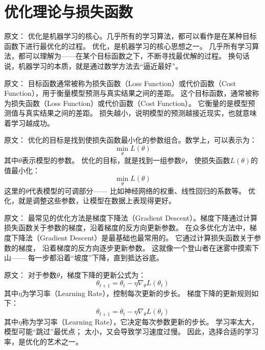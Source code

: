 \section{优化理论与损失函数}

原文：
优化是机器学习的核心。几乎所有的学习算法，都可以看作是在某种目标函数下进行最优化的过程。
优化，是机器学习的核心思想之一。  
几乎所有学习算法，都可以理解为——在某个目标函数之下，不断寻找最优解的过程。  
换句话说，机器学习的本质，就是通过数学方法去“逼近最好”。



原文：
目标函数通常被称为损失函数（Loss Function）或代价函数（Cost Function），用于衡量模型预测与真实结果之间的差距。
这个目标函数，通常被称为损失函数（Loss Function）或代价函数（Cost Function）。  
它衡量的是模型预测值与真实结果之间的差距。  
损失越小，说明模型的预测越接近现实，也就意味着学习越成功。



原文：
优化的目标是找到使损失函数最小化的参数组合。数学上，可以表示为：
$$
\min_{\theta} L(\theta)
$$
其中$\theta$表示模型的参数。
优化的目标，就是找到一组参数$\theta$，  
使损失函数$L(\theta)$的值最小化：
$$
\min_{\theta} L(\theta)
$$  
这里的$\theta$代表模型的可调部分——  
比如神经网络的权重、线性回归的系数等。  
优化，就是调整这些参数，让模型在数据上表现得更好。



原文：
最常见的优化方法是梯度下降法（Gradient Descent）。梯度下降通过计算损失函数关于参数的梯度，沿着梯度的反方向更新参数。
在众多优化方法中，梯度下降法（Gradient Descent）是最基础也最常用的。  
它通过计算损失函数关于参数的梯度，  
沿着梯度的反方向逐步更新参数。  
这就像一个登山者在迷雾中摸索下山——  
每一步都沿着“坡度”下降，直到抵达谷底。



原文：
对于参数$\theta$，梯度下降的更新公式为：
$$
\theta_{t+1} = \theta_t - \eta \nabla_\theta L(\theta_t)
$$
其中$\eta$为学习率（Learning Rate），控制每次更新的步长。
梯度下降的更新规则如下：
$$
\theta_{t+1} = \theta_t - \eta \nabla_\theta L(\theta_t)
$$  
其中$\eta$称为学习率（Learning Rate），它决定每次参数更新的步长。  
学习率太大，模型可能“跳过”最优点；  
太小，又会导致学习速度过慢。  
因此，选择合适的学习率，是优化的艺术之一。



